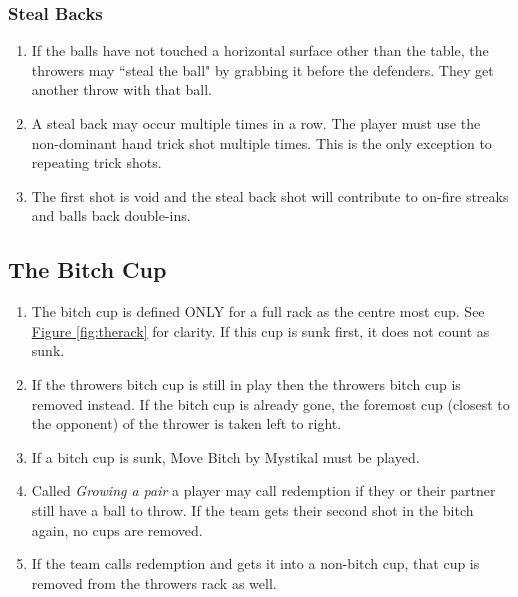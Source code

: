         \subsubsection{Steal Backs}\label{sssec:StealBacks}
        \begin{enumerate}[label=(\roman*), ref=\roman*]
            \item \label{itm:BallsBack,stealback} If the balls have not touched a horizontal surface other than the table, the throwers may ``steal the ball" by grabbing it before the defenders.
                They get another throw with that ball.
            \item \label{itm:BallsBack,stealback_multi} A steal back may occur multiple times in a row.
                The player must use the non-dominant hand trick shot multiple times. This is the only exception to repeating trick shots.
            \item \label{itm:BallsBack,stealback_redo} The first shot is void and the steal back shot will contribute to on-fire streaks and balls back double-ins.
        \end{enumerate}
	\subsection{The Bitch Cup}\label{ssec:BitchCup}
		\begin{enumerate}[label=(\roman*), ref=\roman*]
            \item \label{itm:BitchCup,def} The bitch cup is defined ONLY for a full rack as the centre most cup.
                See \hyperref[fig:therack]{Figure \ref*{fig:therack}} for clarity. If this cup is sunk first, it does not count as sunk.
            \item \label{itm:BitchCup,rem} If the throwers bitch cup is still in play then the throwers bitch cup is removed instead.
                If the bitch cup is already gone, the foremost cup (closest to the opponent) of the thrower is taken left to right.
            \item \label{itm:BitchCup,song} If a bitch cup is sunk, Move Bitch by Mystikal must be played.
            \item \label{itm:BitchCup,redemption} Called \emph{Growing a pair} a player may call redemption if they or their partner still have a ball to throw.
                If the team gets their second shot in the bitch again, no cups are removed.
            \item \label{itm:BitchCup,redemptionFail} If the team calls redemption and gets it into a non-bitch cup, that cup is removed from the throwers rack as well.
        \end{enumerate}
